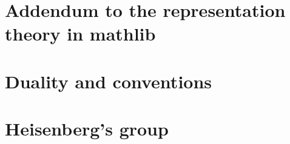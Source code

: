 %

\chapter{Addendum to the representation theory in mathlib}
    

\chapter{Duality and conventions}
    

\chapter{Heisenberg's group}
    
